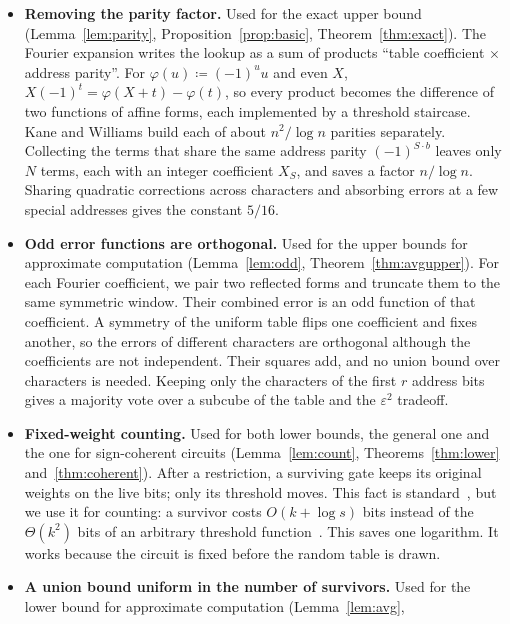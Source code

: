 \documentclass[11pt,letterpaper]{article}
\theoremstyle{remark}
\begin{document}
\begin{itemize}
\item \textbf{Removing the parity factor.} Used for the exact upper
      bound (Lemma~\ref{lem:parity}, Proposition~\ref{prop:basic},
      Theorem~\ref{thm:exact}). The Fourier
      expansion writes the lookup as a sum of products ``table coefficient
      $\times$ address parity''. For $\varphi(u)\coloneqq(-1)^uu$ and even $X$,
      $X(-1)^t=\varphi(X+t)-\varphi(t)$, so every
      product becomes the difference of two functions of affine forms,
      each implemented by a threshold staircase. Kane and Williams build each
      of about $n^2/\log n$ parities
      separately. Collecting the terms that share the same address parity
      $(-1)^{S\cdot b}$ leaves only $N$ terms, each with an integer
      coefficient $X_S$, and saves a factor $n/\log n$. Sharing quadratic corrections across characters and
      absorbing errors at a few special addresses gives the constant $5/16$.
\item \textbf{Odd error functions are orthogonal.} Used for the upper bounds for
      approximate computation (Lemma~\ref{lem:odd},
      Theorem~\ref{thm:avgupper}). For each Fourier coefficient, we pair two
      reflected forms and truncate them to the same symmetric window.
      Their combined error is an odd function of that coefficient. A symmetry of the uniform table flips one coefficient and
      fixes another, so the errors of different characters are orthogonal
      although the coefficients are not independent. Their squares add, and
      no union bound over characters is needed. Keeping only the characters of
      the first $r$ address bits gives a majority vote over a subcube of the
      table and the $\varepsilon^2$ tradeoff.
\item \textbf{Fixed-weight counting.} Used for both lower bounds, the
      general one and the one for sign-coherent circuits
      (Lemma~\ref{lem:count}, Theorems~\ref{thm:lower} and~\ref{thm:coherent}). After a restriction, a
      surviving gate keeps its original weights on the live bits; only its
      threshold moves. This fact is standard~\cite{KW,CSS,CTW}, but we use it
      for counting: a survivor costs $O(k+\log s)$ bits instead of the
      $\Theta(k^2)$ bits of an arbitrary threshold function~\cite{KW,KKL,CSS}.
      This saves one logarithm. It works because the circuit is fixed before
      the random table is drawn.
\item \textbf{A union bound uniform in the number of survivors.} Used
      for the lower bound for approximate computation (Lemma~\ref{lem:avg},

\end{itemize}
\end{document}
